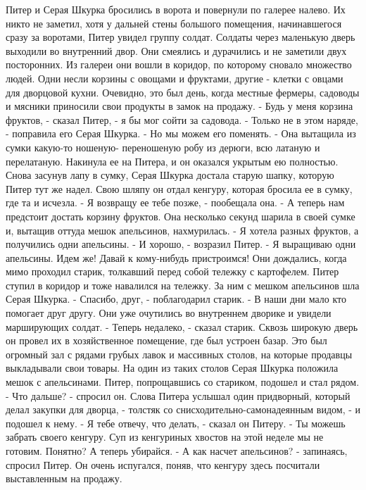     Питер и Серая Шкурка бросились в ворота и повернули по галерее 
налево. Их никто не заметил, хотя у дальней стены большого помещения, 
начинавшегося сразу за воротами, Питер увидел группу солдат. Солдаты 
через маленькую дверь выходили во внутренний двор. Они смеялись и 
дурачились и не заметили двух посторонних.
    Из галереи они вошли в коридор, по которому сновало множество 
людей. Одни несли корзины с овощами и фруктами, другие - клетки с 
овцами для дворцовой кухни. Очевидно, это был день, когда местные 
фермеры, садоводы и мясники приносили свои продукты в замок на 
продажу.
    - Будь у меня корзина фруктов, - сказал Питер, - я бы мог сойти за 
садовода.
    - Только не в этом наряде, - поправила его Серая Шкурка. - Но мы 
можем его поменять. - Она вытащила из сумки какую-то ношеную-
переношеную робу из дерюги, всю латаную и перелатаную. Накинула ее на 
Питера, и он оказался укрытым ею полностью. Снова засунув лапу в 
сумку, Серая Шкурка достала старую шапку, которую Питер тут же надел. 
Свою шляпу он отдал кенгуру, которая бросила ее в сумку, где та и 
исчезла.
    - Я возвращу ее тебе позже, - пообещала она. - А теперь нам 
предстоит достать корзину фруктов.
    Она несколько секунд шарила в своей сумке и, вытащив оттуда мешок 
апельсинов, нахмурилась.
    - Я хотела разных фруктов, а получились одни апельсины.
    - И хорошо, - возразил Питер. - Я выращиваю одни апельсины. Идем 
же! Давай к кому-нибудь пристроимся!
    Они дождались, когда мимо проходил старик, толкавший перед собой 
тележку с картофелем. Питер ступил в коридор и тоже навалился на 
тележку. За ним с мешком апельсинов шла Серая Шкурка.
    - Спасибо, друг, - поблагодарил старик. - В наши дни мало кто 
помогает друг другу.
    Они уже очутились во внутреннем дворике и увидели марширующих 
солдат.
    - Теперь недалеко, - сказал старик. Сквозь широкую дверь он провел 
их в хозяйственное помещение, где был устроен базар. Это был огромный 
зал с рядами грубых лавок и массивных столов, на которые продавцы 
выкладывали свои товары.
    На один из таких столов Серая Шкурка положила мешок с апельсинами. 
Питер, попрощавшись со стариком, подошел и стал рядом.
    - Что дальше? - спросил он.
    Слова Питера услышал один придворный, который делал закупки для 
дворца, - толстяк со снисходительно-самонадеянным видом, - и подошел к 
нему.
    - Я тебе отвечу, что делать, - сказал он Питеру. - Ты можешь 
забрать своего кенгуру. Суп из кенгуриных хвостов на этой неделе мы не 
готовим. Понятно? А теперь убирайся.
    - А как насчет апельсинов? - запинаясь, спросил Питер. Он очень 
испугался, поняв, что кенгуру здесь посчитали выставленным на продажу.
